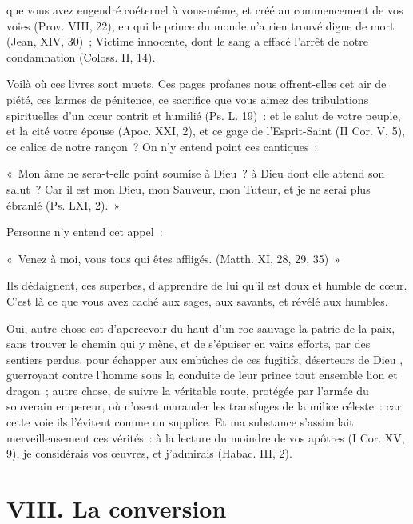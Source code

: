 \documentclass[french,twoside]{book} %
\newenvironment{quoteblock}%
  {\begin{quoting}}
  {\end{quoting}}
\newcommand\chapteropen{} %
\newcommand\chapterclose{} %
\newenvironment{quotebar}{%
    \def\FrameCommand{{\color{rubric!10!}\vrule width 0.5em} \hspace{0.9em}}%
    \def\OuterFrameSep{\itemsep} %
    \MakeFramed {\advance\hsize-\width \FrameRestore}
  }%
  {%
    \endMakeFramed
  }
\renewenvironment{quoteblock}%
  {%
    \savenotes
    \setstretch{0.9}
    \normalfont
    \begin{quotebar}
  }
  {%
    \end{quotebar}
    \spewnotes
  }
\begin{document}
\noindent que vous avez engendré coéternel à vous-même, et créé au commencement de vos voies (Prov. VIII, 22), en qui le prince du monde n’a rien trouvé digne de mort (Jean, XIV, 30) ; Victime innocente, dont le sang a effacé l’arrêt de notre condamnation (Coloss. II, 14).\par
Voilà où ces livres sont muets. Ces pages profanes nous offrent-elles cet air de piété, ces larmes de pénitence, ce sacrifice que vous aimez des tribulations spirituelles d’un cœur contrit et humilié (Ps. L. 19) : et le salut de votre peuple, et la cité votre épouse (Apoc. XXI, 2), et ce gage de l’Esprit-Saint (II Cor. V, 5), ce calice de notre rançon ? On n’y entend point ces cantiques :\par

\begin{quoteblock}
\noindent « Mon âme ne sera-t-elle point soumise à Dieu ? à Dieu dont elle attend son salut ? Car il est mon Dieu, mon Sauveur, mon Tuteur, et je ne serai plus ébranlé (Ps. LXI, 2). »\end{quoteblock}

\noindent Personne n’y entend cet appel :\par

\begin{quoteblock}
\noindent « Venez à moi, vous tous qui êtes affligés. (Matth. XI, 28, 29, 35) »\end{quoteblock}

\noindent Ils dédaignent, ces superbes, d’apprendre de lui qu’il est doux et humble de cœur. C’est là ce que vous avez caché aux sages, aux savants, et révélé aux humbles.\par
Oui, autre chose est d’apercevoir du haut d’un roc sauvage la patrie de la paix, sans trouver le chemin qui y mène, et de s’épuiser en vains efforts, par des sentiers perdus, pour échapper aux embûches de ces fugitifs, déserteurs de Dieu , guerroyant contre l’homme sous la conduite de leur prince tout ensemble lion et dragon ; autre chose, de suivre la véritable route, protégée par l’armée du souverain empereur, où n’osent marauder les transfuges de la milice céleste : car cette voie ils l’évitent comme un supplice. Et ma substance s’assimilait merveilleusement ces vérités : à la lecture du moindre de vos apôtres (I Cor. XV, 9), je considérais vos œuvres, et j’admirais (Habac. III, 2).
\chapterclose


\chapteropen
 \chapter[{VIII. La conversion}]{VIII. La conversion}
\label{VIII}\renewcommand{\leftmark}{VIII. La conversion}
\end{document}
